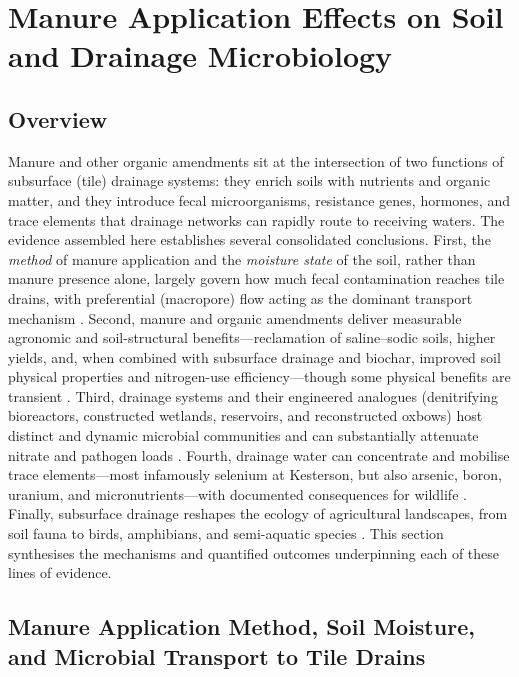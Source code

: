 \documentclass[11pt]{article}
\begin{document}
\section*{Manure Application Effects on Soil and Drainage Microbiology}

\subsection{Overview}

Manure and other organic amendments sit at the intersection of two functions of subsurface (tile) drainage systems: they enrich soils with nutrients and organic matter, and they introduce fecal microorganisms, resistance genes, hormones, and trace elements that drainage networks can rapidly route to receiving waters. The evidence assembled here establishes several consolidated conclusions. First, the \emph{method} of manure application and the \emph{moisture state} of the soil, rather than manure presence alone, largely govern how much fecal contamination reaches tile drains, with preferential (macropore) flow acting as the dominant transport mechanism \parencite{Truhlar2015,Thiagarajan2007,Collins2007,Ding2021}. Second, manure and organic amendments deliver measurable agronomic and soil-structural benefits---reclamation of saline--sodic soils, higher yields, and, when combined with subsurface drainage and biochar, improved soil physical properties and nitrogen-use efficiency---though some physical benefits are transient \parencite{Qadir2001,Tian2023b,Liu2025f,Xiong2025,Brikmans2025}. Third, drainage systems and their engineered analogues (denitrifying bioreactors, constructed wetlands, reservoirs, and reconstructed oxbows) host distinct and dynamic microbial communities and can substantially attenuate nitrate and pathogen loads \parencite{Andrus2014,Porter2015,Hathaway2015,Knorr2023,Schilling2017,Haverstock2017}. Fourth, drainage water can concentrate and mobilise trace elements---most infamously selenium at Kesterson, but also arsenic, boron, uranium, and micronutrients---with documented consequences for wildlife \parencite{SAIKI1987,Ohlendorf2002,Ryu2010,Gao2007,Tayfur2010,Gul2013}. Finally, subsurface drainage reshapes the ecology of agricultural landscapes, from soil fauna to birds, amphibians, and semi-aquatic species \parencite{Nuutinen2001,Marja2013,Dreyfuss2018,Campbell2023}. This section synthesises the mechanisms and quantified outcomes underpinning each of these lines of evidence.

\subsection{Manure Application Method, Soil Moisture, and Microbial Transport to Tile Drains}
\end{document}
